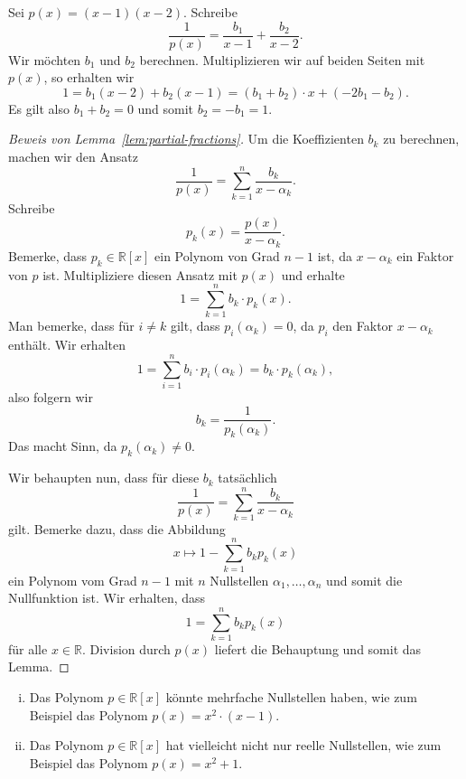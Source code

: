 \documentclass[../main.tex]{subfiles}
\begin{document}
\begin{example}
  Sei $p(x) = (x - 1)(x - 2)$. Schreibe
  \[
    \frac{1}{p(x)} = \frac{b_1}{x - 1} + \frac{b_2}{x - 2}.
  \]
  Wir möchten $b_1$ und $b_2$ berechnen.
  Multiplizieren wir auf beiden Seiten mit $p(x)$,
  so erhalten wir
  \[
    1 = b_1 (x- 2) + b_2(x-1) = (b_1 + b_2) \cdot x
    + (-2b_1 - b_2).
  \]
  Es gilt also $b_1 + b_2 = 0$ und somit $b_2 = -b_1 = 1$.
\end{example}

\begin{proof}[Beweis von Lemma~\ref{lem:partial-fractions}]
  Um die Koeffizienten $b_k$ zu berechnen,
  machen wir den Ansatz
  \[
    \frac{1}{p(x)} = \sum_{k=1}^{n} \frac{b_k}{x - \alpha_k}.
  \]
  Schreibe
  \[
    p_k(x) = \frac{p(x)}{x - \alpha_k}.
  \]
  Bemerke, dass $p_k \in \mathbb{R}[x]$ ein Polynom
  von Grad $n-1$ ist, da $x - \alpha_k$ ein
  Faktor von $p$ ist.
  Multipliziere diesen Ansatz mit $p(x)$ und erhalte
  \[
    1 = \sum_{k=1}^{n} b_k \cdot p_k(x).
  \]
  Man bemerke, dass für $i \ne k$ gilt, dass
  $p_i(\alpha_k) = 0$, da $p_i$ den Faktor
  $x - \alpha_k$ enthält.
  Wir erhalten
  \[
    1 = \sum_{i=1}^{n} b_i \cdot p_i(\alpha_k) = b_k \cdot p_k(\alpha_k),
  \]
  also folgern wir
  \[
    b_k = \frac{1}{p_k(\alpha_k)}.
  \]
  Das macht Sinn, da $p_k(\alpha_k) \neq 0$.

  Wir behaupten nun, dass für diese $b_k$ tatsächlich
  \[
    \frac{1}{p(x)} = \sum_{k=1}^{n}  \frac{b_k}{x - \alpha_k}
  \]
  gilt.
  Bemerke dazu, dass die Abbildung
  \[
    x \mapsto 1 - \sum_{k=1}^{n} b_k p_k(x)
  \]
  ein Polynom vom Grad $n-1$ mit $n$ Nullstellen
  $\alpha_1, \dots, \alpha_n$ und somit die Nullfunktion ist.
  Wir erhalten, dass
  \[
    1 = \sum_{k=1}^{n} b_k p_k(x)
  \]
  für alle $x \in \mathbb{R}$.
  Division durch $p(x)$ liefert die Behauptung und somit
  das Lemma.
\end{proof}

\begin{issues}
  \leavevmode
  \begin{enumerate}[(i)]
    \item Das Polynom $p \in \mathbb{R}[x]$ könnte mehrfache
      Nullstellen haben, wie zum Beispiel
      das Polynom $p(x) = x^2 \cdot (x - 1)$.
    \item Das Polynom $p \in \mathbb{R}[x]$ hat vielleicht
      nicht nur reelle Nullstellen, wie zum Beispiel
      das Polynom $p(x) = x^2 + 1$.
  \end{enumerate}
\end{issues}
\end{document}
